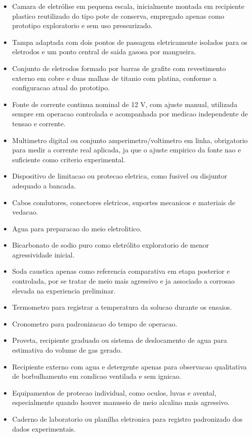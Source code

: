 \documentclass[12pt,oneside,a4paper,brazilian]{abntex2}
\begin{document}
\begin{itemize}
  \item Camara de eletrólise em pequena escala, inicialmente montada em recipiente plastico reutilizado do tipo pote de conserva, empregado apenas como prototipo exploratorio e sem uso pressurizado.
  \item Tampa adaptada com dois pontos de passagem eletricamente isolados para os eletrodos e um ponto central de saida gasosa por mangueira.
  \item Conjunto de eletrodos formado por barras de grafite com revestimento externo em cobre e duas malhas de titanio com platina, conforme a configuracao atual do prototipo.
  \item Fonte de corrente continua nominal de 12 V, com ajuste manual, utilizada sempre em operacao controlada e acompanhada por medicao independente de tensao e corrente.
  \item Multimetro digital ou conjunto amperimetro/voltimetro em linha, obrigatorio para medir a corrente real aplicada, ja que o ajuste empirico da fonte nao e suficiente como criterio experimental.
  \item Dispositivo de limitacao ou protecao eletrica, como fusivel ou disjuntor adequado a bancada.
  \item Cabos condutores, conectores eletricos, suportes mecanicos e materiais de vedacao.
  \item Agua para preparacao do meio eletrolitico.
  \item Bicarbonato de sodio puro como eletrólito exploratorio de menor agressividade inicial.
  \item Soda caustica apenas como referencia comparativa em etapa posterior e controlada, por se tratar de meio mais agressivo e ja associado a corrosao elevada na experiencia preliminar.
  \item Termometro para registrar a temperatura da solucao durante os ensaios.
  \item Cronometro para padronizacao do tempo de operacao.
  \item Proveta, recipiente graduado ou sistema de deslocamento de agua para estimativa do volume de gas gerado.
  \item Recipiente externo com agua e detergente apenas para observacao qualitativa de borbulhamento em condicao ventilada e sem ignicao.
  \item Equipamentos de protecao individual, como oculos, luvas e avental, especialmente quando houver manuseio de meio alcalino mais agressivo.
  \item Caderno de laboratorio ou planilha eletronica para registro padronizado dos dados experimentais.
\end{itemize}
\end{document}
